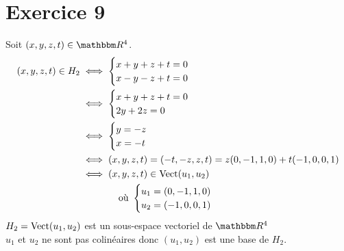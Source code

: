 \part{Exercice 9}
Soit $(x,y,z,t)\in \R^4$.
\begin{align*}
	(x,y,z,t) \in H_2&\iff \begin{cases}
		x+y+z+t = 0\\
		x-y-z+t = 0
	\end{cases}\\
	&\iff \begin{cases}
		x+y+z+t = 0\\
		2y + 2z = 0
	\end{cases}\\
	&\iff \begin{cases}
		y = -z\\
		x = -t
	\end{cases}\\
	&\iff (x,y,z,t) = (-t, -z, z, t) = z(0,-1,1,0) + t(-1,0,0,1)\\
	&\iff(x,y,z,t) \in \operatorname{Vect}(u_1,u_2)\\
	&\qquad \qquad \text{où } \begin{cases}
			u_1 = (0,-1,1,0)\\
			u_2 = (-1,0,0,1)
		\end{cases}
\end{align*}
$H_2 = \operatorname{Vect}(u_1, u_2)$ est un sous-espace vectoriel de $\R^4$ \\
$u_1$ et $u_2$ ne sont pas colinéaires donc $(u_1,u_2)$ est une base de $H_2$.
